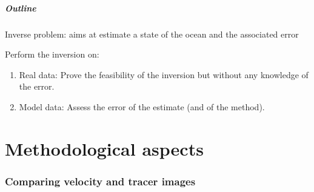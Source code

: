 \documentclass[compress,slidescentered,notes=show]{beamer}
\begin{document}
\begin{frame}
  \frametitle{Outline}

  \begin{block}{}
    Inverse problem: aims at estimate a state of the ocean and the associated error
  \end{block}

  \begin{block}{Perform the inversion on:}
  \begin{enumerate}
    \item Real data: Prove the feasibility of the inversion but without any knowledge of the error.%
    \item Model data: Assess the error of the estimate (and of the method).
  \end{enumerate}
  \end{block}
\end{frame}

\part{Methodological aspects}

\begin{frame}
  \frametitle{\insertromanpartnumber \hspace{1em} \insertpart}
  \tableofcontents[hideotherpart]
\end{frame}
%
\section{Comparing velocity and tracer images}
\end{document}
